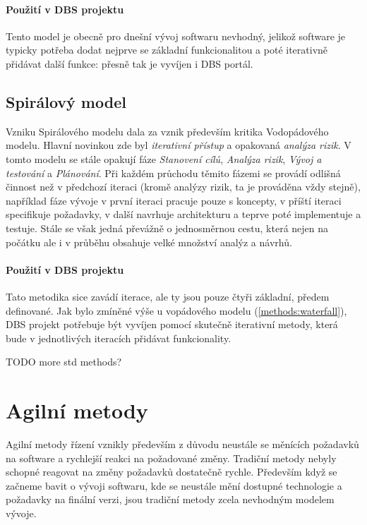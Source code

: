 \paragraph{Použití v DBS projektu}
Tento model je obecně pro dnešní vývoj softwaru nevhodný, jelikož software je typicky potřeba dodat nejprve se základní funkcionalitou a poté iterativně přidávat další funkce: přesně tak je vyvíjen i DBS portál.


\subsection{Spirálový model} \label{methods:spiral}

Vzniku Spirálového modelu dala za vznik především kritika Vodopádového modelu. Hlavní novinkou zde byl \emph{iterativní přístup} a opakovaná \emph{analýza rizik}. V tomto modelu se stále opakují fáze \emph{Stanovení cílů}, \emph{Analýza rizik}, \emph{Vývoj a testování} a \emph{Plánování}. Při každém průchodu těmito fázemi se provádí odlišná činnost než v předchozí iteraci (kromě analýzy rizik, ta je prováděna vždy stejně), například fáze vývoje v první iteraci pracuje pouze s koncepty, v příští iteraci specifikuje požadavky, v další navrhuje architekturu a teprve poté implementuje a testuje.
Stále se však jedná převážně o jednosměrnou cestu, která nejen na počátku ale i v průběhu obsahuje velké množství analýz a návrhů.

\paragraph{Použití v DBS projektu}
Tato metodika sice zavádí iterace, ale ty jsou pouze čtyři základní, předem definované. Jak bylo zmíněné výše u vopádového modelu (\ref{methods:waterfall}), DBS projekt potřebuje být vyvíjen pomocí skutečně iterativní metody, která bude v jednotlivých iteracích přidávat funkcionality.

TODO more std methods?


\section{Agilní metody} \label{methods:agile}

Agilní metody řízení vznikly především z důvodu neustále se měnících požadavků na software a rychlejší reakci na požadované změny. Tradiční metody nebyly schopné reagovat na změny požadavků dostatečně rychle. Především když se začneme bavit o vývoji softwaru, kde se neustále mění dostupné technologie a požadavky na finální verzi, jsou tradiční metody zcela nevhodným modelem vývoje.

